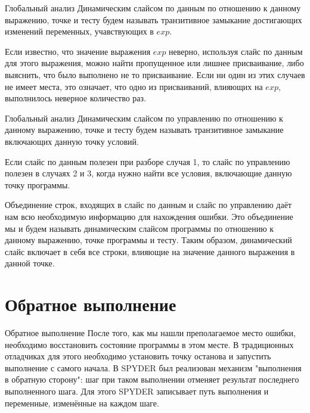 \documentclass[presentation]{beamer}
\begin{document}
\begin{frame}[label={sec:org1250810}]{Глобальный анализ}
\alert{Динамическим слайсом по данным} по отношению к данному выражению, точке и тесту будем называть транзитивное замыкание достигающих изменений переменных, учавствующих в \(exp\).

Если известно, что значение выражения \(exp\) неверно, используя слайс по данным для этого выражения, можно найти пропущенное или лишнее присваивание, либо выяснить, что было
выполнено не то присваивание. Если ни один из этих случаев не имеет места, это означает, что одно из присваиваний, влияющих на \(exp\), выполнилось неверное количество раз.
\end{frame}
\begin{frame}[label={sec:orgc6d8191}]{Глобальный анализ}
\alert{Динамическим слайсом по управлению} по отношению к данному выражению, точке и тесту будем называть транзитивное замыкание включающих данную точку условий.

Если слайс по данным полезен при разборе случая 1, то слайс по управлению полезен в случаях 2 и 3, когда нужно найти все условия, включающие данную точку программы.

Объединение строк, входящих в слайс по данным и слайс по управлению даёт нам всю необходимую информацию для нахождения ошибки. Это объединение мы и будем называть
\alert{динамическим слайсом программы} по отношению к данному выражению, точке программы и тесту. Таким образом, динамический слайс включает в себя все строки, влияющие
на значение данного выражения в данной точке.
\end{frame}
\section{Обратное выполнение}
\label{sec:org1bfb74c}
\begin{frame}[label={sec:orgcbd0a86}]{Обратное выполнение}
После того, как мы нашли преполагаемое место ошибки, необходимо восстановить состояние программы в этом месте. В традиционных отладчиках для этого необходимо установить
точку останова и запустить выполнение с самого начала. В SPYDER был реализован механизм "выполнения в обратную сторону": шаг при таком выполнении отменяет результат последнего
выполненного шага. Для этого SPYDER записывает путь выполнения и переменные, изменённые на каждом шаге.
\end{frame}
\end{document}
